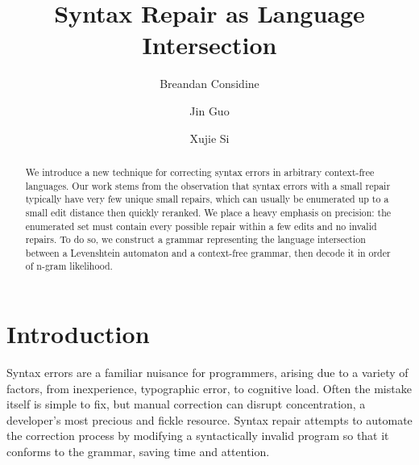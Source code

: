 \documentclass[sigplan,review,acmsmall,nonacm,anonymous]{acmart}\settopmatter{printfolios=false,printccs=false,printacmref=false}
\begin{document}
%
  \title{Syntax Repair as Language Intersection}
  \begin{abstract}
    We introduce a new technique for correcting syntax errors in arbitrary context-free languages. Our work stems from the observation that syntax errors with a small repair typically have very few unique small repairs, which can usually be enumerated up to a small edit distance then quickly reranked. We place a heavy emphasis on precision: the enumerated set must contain every possible repair within a few edits and no invalid repairs. To do so, we construct a grammar representing the language intersection between a Levenshtein automaton and a context-free grammar, then decode it in order of n-gram likelihood.
  \end{abstract}

%
  \author{Breandan Considine}
%
%

  \author{Jin Guo}
  \author{Xujie Si}

  \maketitle

  \section{Introduction}

  Syntax errors are a familiar nuisance for programmers, arising due to a variety of factors, from inexperience, typographic error, to cognitive load. Often the mistake itself is simple to fix, but manual correction can disrupt concentration, a developer's most precious and fickle resource. Syntax repair attempts to automate the correction process by modifying a syntactically invalid program so that it conforms to the grammar, saving time and attention.
\end{document}
